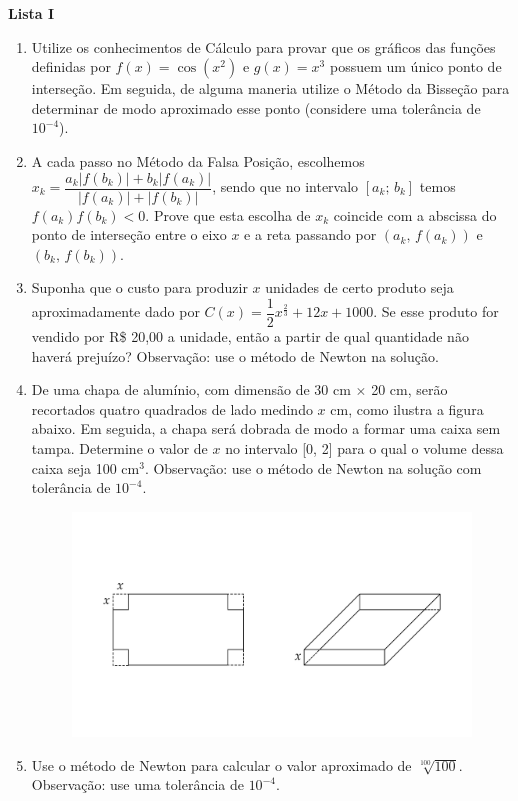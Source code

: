 \documentclass[12pt,a4paper]{article}
\begin{document}
\begin{center}
  \textbf{Lista I}
\end{center}

\begin{enumerate}
  \item Utilize os conhecimentos de Cálculo para provar que os gráficos das
  funções definidas por $f(x) = \cos\left(x^2\right)$ e $g(x) = x^3$ possuem
  um único ponto de interseção. Em seguida, de alguma maneria utilize o Método
  da Bisseção para determinar de modo aproximado esse ponto (considere uma
  tolerância de $10^{-4}$).

  \item A cada passo no Método da Falsa Posição, escolhemos 
  $x_k = \dfrac{a_k|f(b_k)| + b_k|f(a_k)|}{|f(a_k)|+|f(b_k)|}$, sendo que no
  intervalo $[a_k;\,b_k]$ temos $f(a_k)f(b_k)<0$. Prove que esta escolha de
  $x_k$ coincide com a abscissa do ponto de interseção entre o eixo $x$ e a reta
  passando por $(a_k,\,f(a_k))$ e $(b_k,\,f(b_k))$.

  \item Suponha que o custo para produzir $x$ unidades de certo produto seja aproximadamente 
  dado por $C(x) = \dfrac{1}{2}x^{\frac{2}{3}} + 12x + 1000$. Se esse produto for vendido por
  R\$ 20,00 a unidade, então a partir de qual quantidade não haverá prejuízo? Observação: 
  use o método de Newton na solução.

  \item De uma chapa de alumínio, com dimensão de 30 cm $\times$ 20 cm, serão recortados quatro
  quadrados de lado medindo $x$ cm, como ilustra a figura abaixo. Em seguida, a chapa será dobrada
  de modo a formar uma caixa sem tampa. Determine o valor de $x$ no intervalo [0, 2] para o qual 
  o volume dessa caixa seja 100 cm$^3$. Observação: use o método de Newton na solução com tolerância
  de $10^{-4}$.
  
  \begin{figure}[h]
    \centering
    \includegraphics[scale=0.4]{imagem/caixa-retangular.pdf}
  \end{figure}

  \item Use o método de Newton para calcular o valor aproximado de $\sqrt[100]{100}$.
  Observação: use uma tolerância de $10^{-4}$.
     
\end{enumerate}
\end{document}

